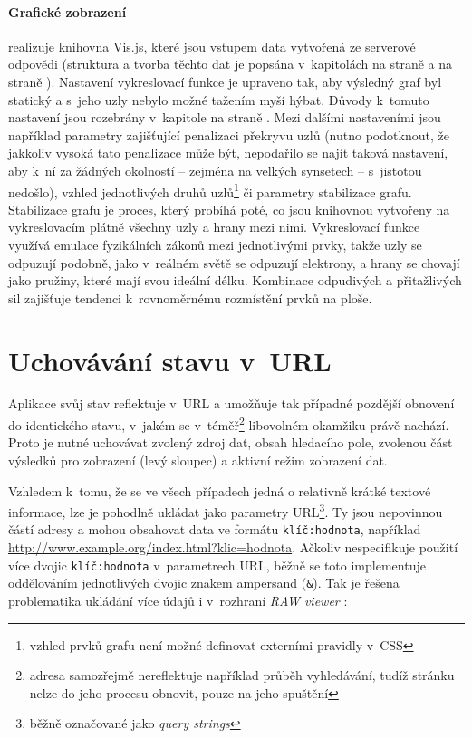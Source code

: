 \documentclass[a4paper, 11pt, oneside, showtrims]{book}
\newcommand{\simplywn}{\textit{RAW viewer} }
\newcommand{\itNameRef}[1]{\textit{\nameref{#1}}}
\begin{document}
				\paragraph{Grafické zobrazení} realizuje knihovna Vis.js, které jsou vstupem data vytvořená ze serverové odpovědi (struktura a tvorba těchto dat je popsána v~kapitolách \itNameRef{cha:answerStruct} na straně \pageref{cha:answerStruct} a \itNameRef{cha:zpracovani} na straně \pageref{cha:zpracovani}). Nastavení vykreslovací funkce je upraveno tak, aby výsledný graf byl statický a s~jeho uzly nebylo možné tažením myší hýbat. Důvody k~tomuto nastavení jsou rozebrány v~kapitole \itNameRef{cha:graphui} na straně \pageref{cha:graphui}. Mezi dalšími nastaveními jsou například parametry zajišťující penalizaci překryvu uzlů (nutno podotknout, že jakkoliv vysoká tato penalizace může být, nepodařilo se najít taková nastavení, aby k~ní za žádných okolností -- zejména na velkých synsetech -- s~jistotou nedošlo), vzhled jednotlivých druhů uzlů\footnote{vzhled prvků grafu není možné definovat externími pravidly v~CSS} či parametry stabilizace grafu. Stabilizace grafu je proces, který probíhá poté, co jsou knihovnou vytvořeny na vykreslovacím plátně všechny uzly a hrany mezi nimi. Vykreslovací funkce využívá emulace fyzikálních zákonů mezi jednotlivými prvky, takže uzly se odpuzují podobně, jako v~reálném světě se odpuzují elektrony, a hrany se chovají jako pružiny, které mají svou ideální délku. Kombinace odpudivých a přitažlivých sil zajišťuje tendenci k~rovnoměrnému rozmístění prvků na ploše.

			\section{Uchovávání stavu v~URL}

				Aplikace svůj stav reflektuje v~URL a umožňuje tak případné pozdější obnovení do identického stavu, v~jakém se v~téměř\footnote{adresa samozřejmě nereflektuje například průběh vyhledávání, tudíž stránku nelze do jeho procesu obnovit, pouze na jeho spuštění} libovolném okamžiku právě nachází. Proto je nutné uchovávat zvolený zdroj dat, obsah hledacího pole, zvolenou část výsledků pro zobrazení (levý sloupec) a aktivní režim zobrazení dat. 

				Vzhledem k~tomu, že se ve všech případech jedná o relativně krátké textové informace, lze je pohodlně ukládat jako parametry URL\footnote{běžně označované jako \textit{query strings}}. Ty jsou nepovinnou částí adresy a mohou obsahovat data ve formátu \texttt{klíč:hodnota}, například \url{http://www.example.org/index.html?klic=hodnota}. \parencite{berners2005uniform} Ačkoliv \textcite{berners2005uniform} nespecifikuje použití více dvojic \texttt{klíč:hodnota} v~parametrech URL, běžně se toto implementuje oddělováním jednotlivých dvojic znakem ampersand (\texttt{\&}). Tak je řešena problematika ukládání více údajů i v~rozhraní \simplywn: 
\end{document}
